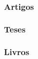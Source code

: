 \documentclass{beamer}
\begin{document}
{%

  \begin{frame}\frametitle{Artigos}
  \end{frame}
}

{%

  \begin{frame}\frametitle{Teses}
  \end{frame}
}

{%

  \begin{frame}\frametitle{Livros}
  \end{frame}
}
\end{document}

